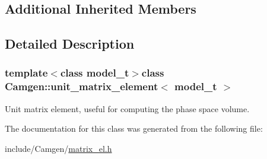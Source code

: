\subsection*{Additional Inherited Members}


\subsection{Detailed Description}
\subsubsection*{template$<$class model\-\_\-t$>$class Camgen\-::unit\-\_\-matrix\-\_\-element$<$ model\-\_\-t $>$}

Unit matrix element, useful for computing the phase space volume. 

The documentation for this class was generated from the following file\-:\begin{DoxyCompactItemize}
\item 
include/\-Camgen/\hyperlink{a00669}{matrix\-\_\-el.\-h}\end{DoxyCompactItemize}
